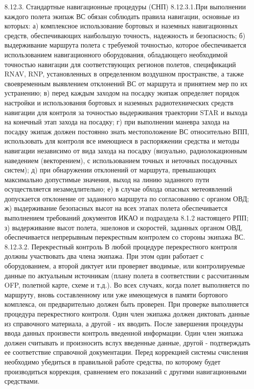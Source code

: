 8.12.3.	Стандартные навигационные процедуры (СНП)
8.12.3.1.При выполнении каждого полета экипаж ВС обязан соблюдать правила навигации, основные из которых:
а)	комплексное использование бортовых и наземных навигационных средств, обеспечивающих наибольшую точность, надежность и безопасность;
б)	выдерживание маршрута полета с требуемой точностью, которое обеспечивается использованием навигационного оборудования, обладающего необходимой точностью навигации для соответствующих регионов полетов, спецификаций RNAV, RNP, установленных в определенном воздушном пространстве, а также своевременным выявлением отклонений ВС от маршрута и принятием мер по их устранению;
в)	перед каждым заходом на посадку экипаж определяет порядок настройки и использования бортовых и наземных радиотехнических средств навигации для контроля за точностью выдерживания траектории STAR и выхода на конечный этап захода на посадку;
г)	при выполнении маневра захода на посадку экипаж должен постоянно знать местоположение ВС относительно ВПП, использовать для контроля все имеющиеся в распоряжении средства и методы навигации независимо от вида захода на посадку (визуально, радиолокационным наведением (векторением), с использованием точных и неточных посадочных систем);
д)	при обнаружении отклонений от маршрута, превышающих максимально допустимые значения, выход на линию заданного пути осуществляется незамедлительно;
е)	в случае обхода опасных метеоявлений допускается отклонение от заданного маршрута по согласованию с органом ОВД;
ж)	выдерживание безопасных высот на всех этапах полета обеспечивается выполнением требований документов ИКАО и подраздела 8.1.2 настоящего РПП;
з)	выдерживание высот полета, эшелонов и скоростей, заданных органом ОВД, обеспечивается непрерывным перекрестным контролем со стороны экипажа ВС.
8.12.3.2.	Перекрестный контроль
В любой процедуре перекрестного контроля должны участвовать два члена экипажа. При этом один работает с оборудованием, а второй диктует или проверяет вводимые, или контролируемые данные по актуальным источникам (плану полета в соответствии с рассчитанным OFP, полетной карте, схеме и т.д.). 
Во всех случаях, когда полет выполняется по маршруту, вновь составленному или уже имеющемуся в памяти бортового комплекса, он предварительно должен быть проверен. При проверке выполняется процедура перекрестного контроля. 
Один член экипажа должен диктовать данные из справочного материала, а другой - их вводить. После завершения процедуры ввода данных произвести контроль введенной информации.
Один член экипажа должен считывать и произносить вслух введенные данные, другой - подтверждать ее соответствие справочной документации. 
Перед коррекцией системы счисления необходимо убедиться в правильной работе средства, по которому будет производиться коррекция, сравнением его показаний с другими навигационными средствами. 


